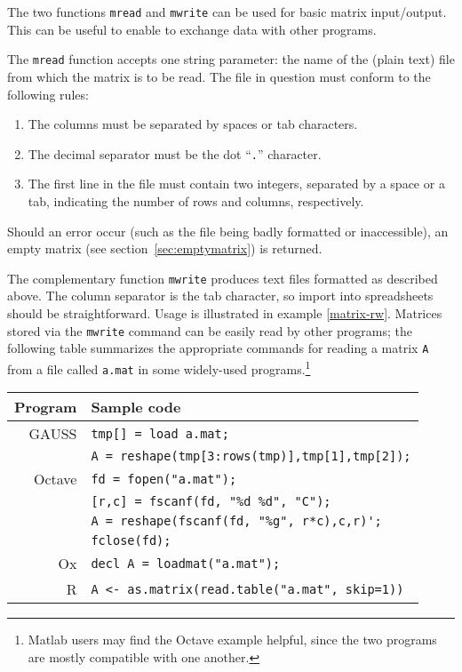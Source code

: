 The two functions \texttt{mread} and \texttt{mwrite} can be used for
basic matrix input/output. This can be useful to enable  to
exchange data with other programs.

The \texttt{mread} function accepts one string parameter: the name of
the (plain text) file from which the matrix is to be read.  The file
in question must conform to the following rules:
%
\begin{enumerate}
\item The columns must be separated by spaces or tab characters.
\item The decimal separator must be the dot ``\texttt{.}'' character.
\item The first line in the file must contain two integers, separated
  by a space or a tab, indicating the number of rows and columns,
  respectively.
\end{enumerate}

Should an error occur (such as the file being badly formatted or
inaccessible), an empty matrix (see section~\ref{sec:emptymatrix}) is
returned.

The complementary function \texttt{mwrite} produces text files
formatted as described above.  The column separator is the tab
character, so import into spreadsheets should be straightforward.
Usage is illustrated in example \ref{matrix-rw}.  Matrices stored via
the \texttt{mwrite} command can be easily read by other programs; the
following table summarizes the appropriate commands for reading a
matrix \texttt{A} from a file called \texttt{a.mat} in some
widely-used programs.\footnote{Matlab users may find the Octave
  example helpful, since the two programs are mostly compatible with one
  another.}

\begin{center}
  \begin{tabular}{rl}
    \textbf{Program} & \textbf{Sample code} \\
    \hline
    GAUSS  & \verb|tmp[] = load a.mat;| \\
    & \verb|A = reshape(tmp[3:rows(tmp)],tmp[1],tmp[2]);| \\
    Octave & \verb|fd = fopen("a.mat");| \\
    & \verb|[r,c] = fscanf(fd, "%d %d", "C");| \\
    & \verb|A = reshape(fscanf(fd, "%g", r*c),c,r)';| \\
    & \verb|fclose(fd);| \\
    Ox     & \verb|decl A = loadmat("a.mat");| \\
    R      & \verb|A <- as.matrix(read.table("a.mat", skip=1))| \\
  \hline
\end{tabular}
\end{center}


